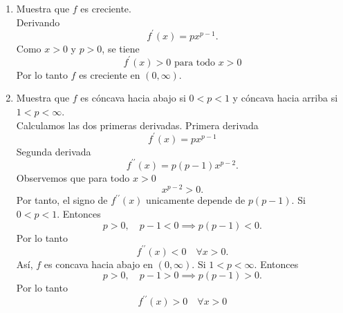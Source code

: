 \documentclass[12pt,a4paper]{article}
\begin{document}
    \begin{solucion}
        \begin{enumerate}
            \item[(a)] Muestra que $f$ es creciente.\\
            Derivando
            \begin{equation*}
                f^{\prime}(x)=px^{p-1}.
            \end{equation*}
            Como $x\gt0$ y $p\gt0$, se tiene
            \begin{equation*}
                f^{\prime}(x)\gt0\text{ para todo }x\gt0
            \end{equation*}
            Por lo tanto $f$ es creciente en $(0,\infty)$.
            \item[(b)] Muestra que $f$ es cóncava hacia abajo si $0\lt p\lt1$ y cóncava
            hacia arriba si $1\lt p\lt\infty$.\\
            Calculamos las dos primeras derivadas. Primera derivada
            \begin{equation*}
                f^{\prime}(x)=px^{p-1}
            \end{equation*}
            Segunda derivada
            \begin{equation*}
                f^{\prime\prime}(x)=p(p-1)x^{p-2}.
            \end{equation*}
            Observemos que para todo $x\gt0$
            \begin{equation*}
                x^{p-2}\gt0.
            \end{equation*}
            Por tanto, el signo de $f^{\prime\prime}(x)$ unicamente depende de $p(p-1)$.
            Si $0\lt p\lt1$. Entonces
            \begin{equation*}
                p\gt0,\quad p-1\lt0\implies p(p-1)\lt0.
            \end{equation*}
            Por lo tanto
            \begin{equation*}
                f^{\prime\prime}(x)\lt0\quad\forall x\gt0.
            \end{equation*}
            Así, $f$ es concava hacia abajo en $(0,\infty)$. Si $1\lt p\lt\infty$.
            Entonces
            \begin{equation*}
                p\gt0,\quad p-1\gt0\implies p(p-1)\gt0.
            \end{equation*}
            Por lo tanto
            \begin{equation*}
                f^{\prime\prime}(x)\gt0\quad\forall x\gt0

\end{equation*}
\end{enumerate}
\end{solucion}
\end{document}
